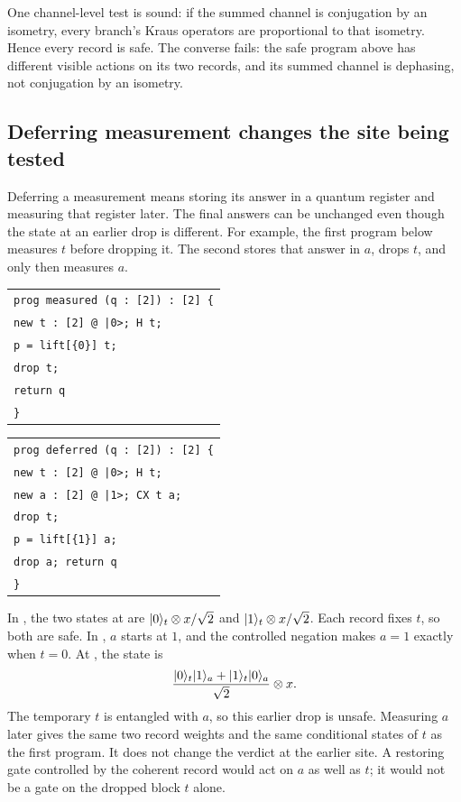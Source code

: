 \documentclass[acmsmall,screen,review,anonymous,nonacm]{acmart}
\begin{document}
\stmtChannel

One channel-level test is sound: if the summed channel is conjugation
by an isometry, every branch's Kraus operators are proportional to that
isometry. Hence every record is safe. The converse fails: the safe
program above has different visible actions on its two records, and
its summed channel is dephasing, not conjugation by an isometry.

\subsection{Deferring measurement changes the site being tested}

Deferring a measurement means storing its answer in a quantum register
and measuring that register later. The final answers can be unchanged
even though the state at an earlier drop is different.
For example, the first program below measures $t$ before
dropping it. The second stores that answer in $a$, drops $t$, and only
then measures $a$.
\begin{center}
\begin{minipage}[t]{.48\linewidth}
\small\begin{tabular}[t]{@{}l@{}}
\texttt{prog measured (q : [2]) : [2] \{}\\
\texttt{\quad new t : [2] @ |0>; H t;}\\
\texttt{\quad p = lift[\{0\}] t;}\\
\texttt{\quad drop t;}\\
\texttt{\quad return q}\\
\texttt{\}}\\
\end{tabular}
\end{minipage}\hfill
\begin{minipage}[t]{.48\linewidth}
\small\begin{tabular}[t]{@{}l@{}}
\texttt{prog deferred (q : [2]) : [2] \{}\\
\texttt{\quad new t : [2] @ |0>; H t;}\\
\texttt{\quad new a : [2] @ |1>; CX t a;}\\
\texttt{\quad drop t;}\\
\texttt{\quad p = lift[\{1\}] a;}\\
\texttt{\quad drop a; return q}\\
\texttt{\}}\\
\end{tabular}
\end{minipage}
\end{center}
In , the two states at  are
$\lvert 0 \rangle_t\otimes x/\sqrt2$ and $\lvert 1 \rangle_t\otimes x/\sqrt2$.
Each record fixes $t$, so both are safe.
In , $a$ starts at $1$, and the controlled negation makes
$a=1$ exactly when $t=0$. At , the state is
\[
 \frac{\lvert 0 \rangle_t\lvert 1 \rangle_a+\lvert 1 \rangle_t\lvert 0 \rangle_a}{\sqrt2}\otimes x.
\]
The temporary $t$ is entangled with $a$, so this earlier drop is unsafe.
Measuring $a$ later gives the same two record weights and the same
conditional states of $t$ as the first program. It does not change the
verdict at the earlier site. A restoring gate controlled by the coherent
record would act on $a$ as well as $t$; it would not be a gate on the
dropped block $t$ alone.
\end{document}
